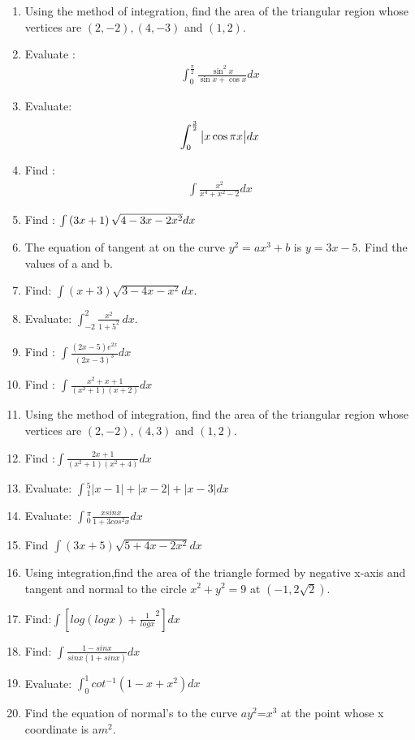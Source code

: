 \begin{enumerate}
    \item Using the method of integration, find the area of the triangular region whose vertices are $(2,-2), (4,-3)$ and $(1,2)$.
    \item Evaluate :
          \begin{align*}
              \int_{0}^\frac{\pi}{2}{\frac{\sin^2x}{\sin x+ \cos x}}{dx}
          \end{align*}
    \item Evaluate:
          \begin{align*}
              \int_{0}^\frac{3}{2}{\begin{vmatrix}x \cos \pi x\end{vmatrix}}dx
          \end{align*}
    \item Find :
          \begin{align*}
              \int{\frac{x^2}{x^4+x^2-2}}dx
          \end{align*}
    \item Find : $\int{\ensuremath{\left(3x + 1\right)} \sqrt{4-3x-2x^2}}dx $
    \item The equation of tangent at  on the curve $y^2=ax^3+b$ is $y=3x-5$. Find the values of a and b.
    \item Find: $\int(x+3)\sqrt{3-4x-x^2} dx$.
    \item Evaluate: \(\int_{-2}^{2}\frac{x^2}{1+5^2}\,dx\).
    \item Find : $\int{\frac{(2x-5)e^{2x}}{(2x-3)^3}}dx$
    \item Find : $\int{\frac{x^2+x+1}{(x^2+1)(x+2)}}dx$
    \item Using the method of integration, find the area of the triangular region whose vertices are $(2, -2),(4,3)$ and $(1,2)$.
    \item Find :$ \int{\frac{2x+1}{(x^{2}+1)(x^{2}+4)}}dx$
    \item Evaluate: $\int{^5_1{|x-1|+|x-2|+|x-3|}dx}$
    \item Evaluate: $\int{^\pi_0\frac{xsinx}{1+3cos^{2}x}}dx$
    \item Find $\int(3x+5)\sqrt{5+4x-2x^{2}}dx$
    \item Using integration,find the area of the triangle formed by negative x-axis and tangent and normal to the circle $x^{2}+y^{2}=9$ at $(-1,2\sqrt{2})$.
    \item Find:$\int[log(logx)+\frac{1}{logx}^2]dx$
    \item Find: $\int\frac{1-sinx}{sinx(1+sinx)}dx$
    \item Evaluate: $ \int_{0}^{1}cot^{-1}(1-x+x^{2})dx$
    \item Find the equation of normal's to the curve $ay^{2}$=$x^{3}$ at the point whose x coordinate is a$m^{2}$.

\end{enumerate}

